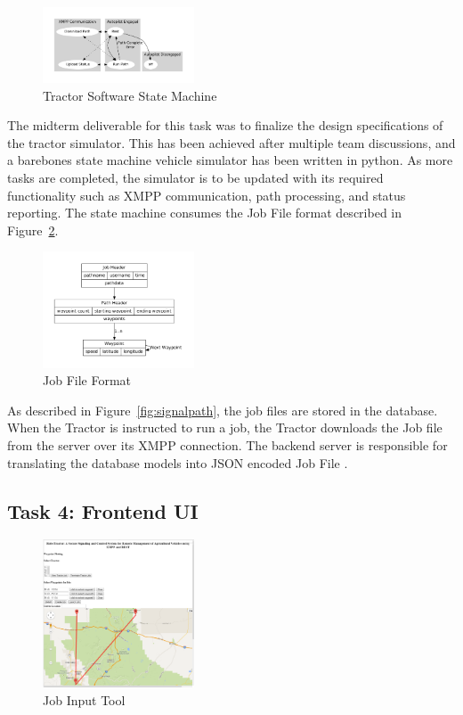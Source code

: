 \documentclass[conference,12pt]{IEEEtran}
\begin{document}
\begin{figure}
\centering
\includegraphics[width=0.4\textwidth]{machine.pdf}
\caption{Tractor Software State Machine}
\label{fig:tractorstatemachine}
\end{figure}
The midterm deliverable for this task was to finalize the design specifications
of the tractor simulator. This has been achieved after multiple team
discussions, and a barebones state machine vehicle simulator has been written in
python. As more tasks are completed, the simulator is to be updated with its
required functionality such as XMPP communication, path processing, and status
reporting. The state machine consumes the Job File format described in
Figure~\ref{fig:jobfile}.  

\begin{figure}
\centering
\includegraphics[width=0.4\textwidth]{job_file.pdf}
\caption{Job File Format}
\label{fig:jobfile}
\end{figure}

As described in Figure~\ref{fig:signalpath}, the job files are stored in the
database. When the Tractor is instructed to run a job, the Tractor downloads the
Job file from the server over its XMPP connection. The backend server is
responsible for translating the database models into JSON encoded Job
File \autocite{_json_2014}.

\subsection{Task 4: Frontend UI}
\begin{figure}
\centering
\includegraphics[width=0.4\textwidth]{../PlottingV1.png}
\caption{Job Input Tool}
\label{fig:jobinput}
\end{figure}
\end{document}
